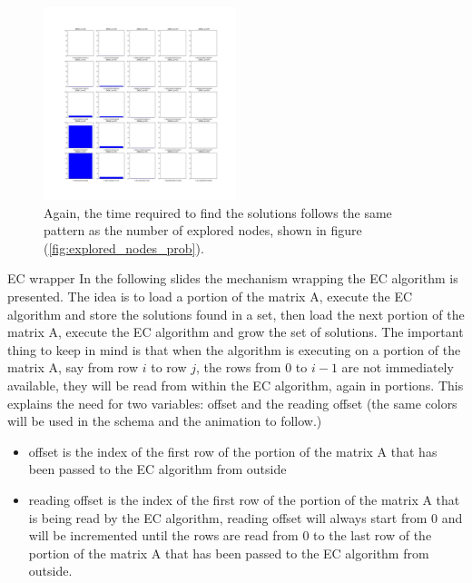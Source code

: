 \documentclass{beamer}
\begin{document}
\begin{frame}{}
    \begin{figure}
        \centering
        \includegraphics[width=0.5\textwidth]{time_to_solve_prob.pdf}
        \caption{Again, the time required to find the solutions follows the same pattern as 
        the number of explored nodes, shown in figure (\ref{fig:explored_nodes_prob}).}
        \label{fig:time_to_solve_prob}
    \end{figure}
\end{frame}

\begin{frame}{EC wrapper}
    In the following slides the mechanism wrapping the EC algorithm
    is presented. 
    The idea is to load a portion of the matrix A, execute the EC algorithm
    and store the solutions found in a set, then load the next portion of
    the matrix A, execute the EC algorithm and grow the set of solutions.
    The important thing to keep in mind is that when the algorithm 
    is executing on a portion of the matrix A, say from row $i$ to row $j$,
    the rows from $0$ to $i-1$ are not immediately available, they will
    be read from within the EC algorithm, again in portions.
    This explains the need for two variables:
    \textcolor{offset}{offset} and the \textcolor{reading_offset}{reading offset}
    (the same colors will be used in the schema and the animation to follow.)
\end{frame}

\begin{frame}{}
    \begin{itemize}
        \item \textcolor{offset}{offset} is the index of the first row of the portion
            of the matrix A that has been passed to the EC algorithm from outside
        \item \textcolor{reading_offset}{reading offset} is the index of the first row of the portion
            of the matrix A that is being read by the EC algorithm,
            reading offset will always start from 0 and will be incremented until
            the rows are read from 0 to the last row of the portion of the matrix A 
            that has been passed to the EC algorithm from outside.
    \end{itemize}
\end{frame}
\end{document}
